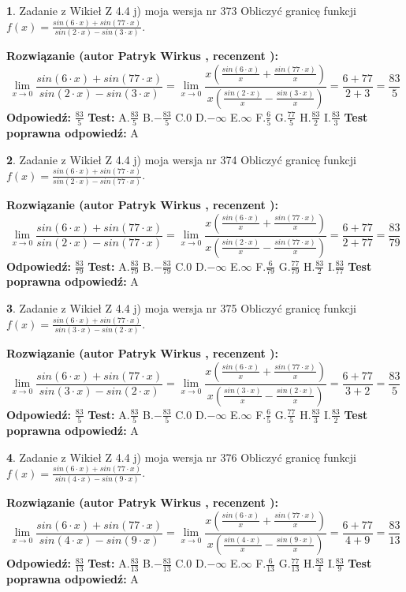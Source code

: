 \documentclass[12pt, a4paper]{article}
\theoremstyle{definition} %
\newtheorem{zad}{}
\newcommand{\zadStart}[1]{\begin{zad}#1\newline}
\newcommand{\zadStop}{\end{zad}}
\newcommand{\rozwStart}[2]{\noindent \textbf{Rozwiązanie (autor #1 , recenzent #2): }\newline}
\newcommand{\rozwStop}{\newline}
\newcommand{\odpStart}{\noindent \textbf{Odpowiedź:}\newline}
\newcommand{\odpStop}{\newline}
\newcommand{\testStart}{\noindent \textbf{Test:}\newline}
\newcommand{\testStop}{\newline}
\newcommand{\kluczStart}{\noindent \textbf{Test poprawna odpowiedź:}\newline}
\newcommand{\kluczStop}{\newline}
\begin{document}
\zadStart{Zadanie z Wikieł Z 4.4 j) moja wersja nr 373}
Obliczyć granicę funkcji $f(x)=\frac{sin(6\cdot x) +sin(77\cdot x)}{sin(2\cdot x) -sin(3\cdot x)}$.
\zadStop
\rozwStart{Patryk Wirkus}{}
$$\lim\limits_{x\to 0}\frac{sin(6\cdot x) +sin(77\cdot x)}{sin(2\cdot x) -sin(3\cdot x)}=\lim\limits_{x\to 0}\frac{x(\frac{sin(6\cdot x)}{x}+\frac{sin(77\cdot x)}{x})}{x(\frac{sin(2\cdot x)}{x}-\frac{sin(3\cdot x)}{x})}=\frac{6+77}{2+3} = \frac{83}{5}$$
\rozwStop
\odpStart
$\frac{83}{5}$
\odpStop
\testStart
A.$\frac{83}{5}$
B.$-\frac{83}{5}$
C.$0$
D.$-\infty$
E.$\infty$
F.$\frac{6}{5}$
G.$\frac{77}{5}$
H.$\frac{83}{2}$
I.$\frac{83}{3}$
\testStop
\kluczStart
A
\kluczStop



\zadStart{Zadanie z Wikieł Z 4.4 j) moja wersja nr 374}
Obliczyć granicę funkcji $f(x)=\frac{sin(6\cdot x) +sin(77\cdot x)}{sin(2\cdot x) -sin(77\cdot x)}$.
\zadStop
\rozwStart{Patryk Wirkus}{}
$$\lim\limits_{x\to 0}\frac{sin(6\cdot x) +sin(77\cdot x)}{sin(2\cdot x) -sin(77\cdot x)}=\lim\limits_{x\to 0}\frac{x(\frac{sin(6\cdot x)}{x}+\frac{sin(77\cdot x)}{x})}{x(\frac{sin(2\cdot x)}{x}-\frac{sin(77\cdot x)}{x})}=\frac{6+77}{2+77} = \frac{83}{79}$$
\rozwStop
\odpStart
$\frac{83}{79}$
\odpStop
\testStart
A.$\frac{83}{79}$
B.$-\frac{83}{79}$
C.$0$
D.$-\infty$
E.$\infty$
F.$\frac{6}{79}$
G.$\frac{77}{79}$
H.$\frac{83}{2}$
I.$\frac{83}{77}$
\testStop
\kluczStart
A
\kluczStop



\zadStart{Zadanie z Wikieł Z 4.4 j) moja wersja nr 375}
Obliczyć granicę funkcji $f(x)=\frac{sin(6\cdot x) +sin(77\cdot x)}{sin(3\cdot x) -sin(2\cdot x)}$.
\zadStop
\rozwStart{Patryk Wirkus}{}
$$\lim\limits_{x\to 0}\frac{sin(6\cdot x) +sin(77\cdot x)}{sin(3\cdot x) -sin(2\cdot x)}=\lim\limits_{x\to 0}\frac{x(\frac{sin(6\cdot x)}{x}+\frac{sin(77\cdot x)}{x})}{x(\frac{sin(3\cdot x)}{x}-\frac{sin(2\cdot x)}{x})}=\frac{6+77}{3+2} = \frac{83}{5}$$
\rozwStop
\odpStart
$\frac{83}{5}$
\odpStop
\testStart
A.$\frac{83}{5}$
B.$-\frac{83}{5}$
C.$0$
D.$-\infty$
E.$\infty$
F.$\frac{6}{5}$
G.$\frac{77}{5}$
H.$\frac{83}{3}$
I.$\frac{83}{2}$
\testStop
\kluczStart
A
\kluczStop



\zadStart{Zadanie z Wikieł Z 4.4 j) moja wersja nr 376}
Obliczyć granicę funkcji $f(x)=\frac{sin(6\cdot x) +sin(77\cdot x)}{sin(4\cdot x) -sin(9\cdot x)}$.
\zadStop
\rozwStart{Patryk Wirkus}{}
$$\lim\limits_{x\to 0}\frac{sin(6\cdot x) +sin(77\cdot x)}{sin(4\cdot x) -sin(9\cdot x)}=\lim\limits_{x\to 0}\frac{x(\frac{sin(6\cdot x)}{x}+\frac{sin(77\cdot x)}{x})}{x(\frac{sin(4\cdot x)}{x}-\frac{sin(9\cdot x)}{x})}=\frac{6+77}{4+9} = \frac{83}{13}$$
\rozwStop
\odpStart
$\frac{83}{13}$
\odpStop
\testStart
A.$\frac{83}{13}$
B.$-\frac{83}{13}$
C.$0$
D.$-\infty$
E.$\infty$
F.$\frac{6}{13}$
G.$\frac{77}{13}$
H.$\frac{83}{4}$
I.$\frac{83}{9}$
\testStop
\kluczStart
A
\kluczStop
\end{document}
